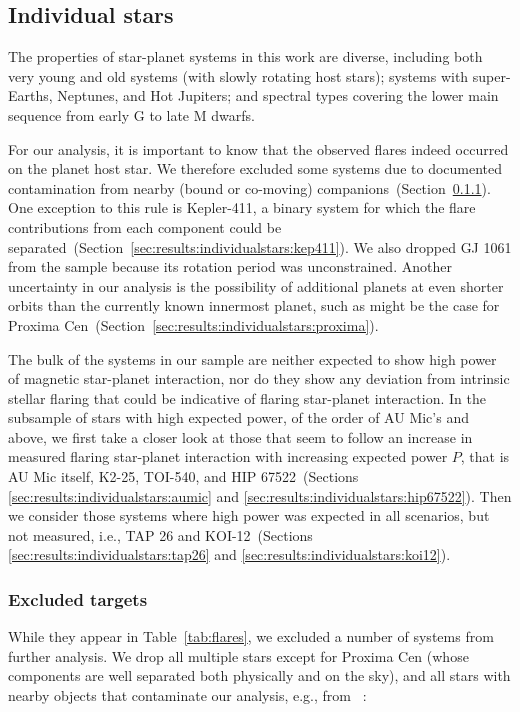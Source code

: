 \documentclass[twocolumn]{aastex631}
\begin{document}
\subsection{Individual stars}
\label{sec:results:individualstars}
The properties of star-planet systems in this work are diverse, including both very young and old systems (with slowly rotating host stars); systems with super-Earths, Neptunes, and Hot Jupiters; and spectral types covering the lower main sequence from early G to late M dwarfs. 

For our analysis, it is important to know that the observed flares indeed occurred on the planet host star. We therefore excluded some systems due to documented contamination from nearby (bound or co-moving) companions~(Section~\ref{sec:results:individualstars:excluded}). One exception to this rule is Kepler-411, a binary system for which the flare contributions from each component could be separated~(Section~\ref{sec:results:individualstars:kep411}). We also dropped GJ 1061 from the sample because its rotation period was unconstrained. Another uncertainty in our analysis is the possibility of additional planets at even shorter orbits than the currently known innermost planet, such as might be the case for Proxima Cen~(Section~\ref{sec:results:individualstars:proxima}). 

The bulk of the systems in our sample are neither expected to show high power of magnetic star-planet interaction, nor do they show any deviation from intrinsic stellar flaring that could be indicative of flaring star-planet interaction. In the subsample of stars with high expected power, of the order of AU Mic's and above, we first take a closer look at those that seem to follow an increase in measured flaring star-planet interaction with increasing expected power $P$, that is AU Mic itself, K2-25, TOI-540, and HIP 67522~(Sections \ref{sec:results:individualstars:aumic} and \ref{sec:results:individualstars:hip67522}). Then we consider those systems where high power was expected in all scenarios, but not measured, i.e., TAP 26 and KOI-12~(Sections \ref{sec:results:individualstars:tap26} and \ref{sec:results:individualstars:koi12}).
\subsubsection{Excluded targets}
\label{sec:results:individualstars:excluded}

While they appear in Table~\ref{tab:flares}, we excluded a number of systems from further analysis. We drop all multiple stars except for Proxima Cen (whose components are well separated both physically and on the sky), and all stars with nearby objects that contaminate our analysis, e.g., from ~\citet{ziegler2018measuring}: 
\end{document}
